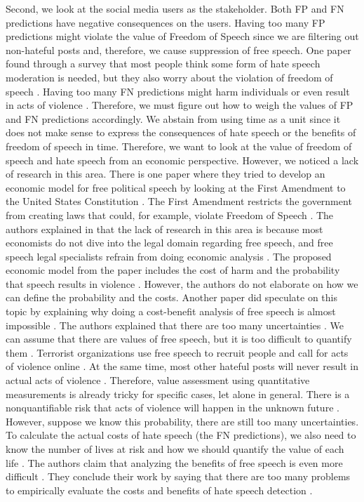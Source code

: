 Second, we look at the social media users as the stakeholder.
%
Both FP and FN predictions have negative consequences on the users.
%
Having too many FP predictions might violate the value of Freedom of Speech since we are filtering out non-hateful posts and, therefore, we cause suppression of free speech.
%
One paper found through a survey that most people think some form of hate speech moderation is needed, but they also worry about the violation of freedom of speech \citep{olteanu2017limits}.
%
Having too many FN predictions might harm individuals or even result in acts of violence \citep{ecri-hate-speech-and-violence}.
%
Therefore, we must figure out how to weigh the values of FP and FN predictions accordingly.
%
We abstain from using time as a unit since it does not make sense to express the consequences of hate speech or the benefits of freedom of speech in time.
%
Therefore, we want to look at the value of freedom of speech and hate speech from an economic perspective.
%
However, we noticed a lack of research in this area.
%
There is one paper where they tried to develop an economic model for free political speech by looking at the First Amendment to the United States Constitution \citep{posner1986free}.
%
The First Amendment restricts the government from creating laws that could, for example, violate Freedom of Speech \citep{first-amendment-white-house}.
%
The authors explained in \citet{posner1986free} that the lack of research in this area is because most economists do not dive into the legal domain regarding free speech, and free speech legal specialists refrain from doing economic analysis \citep{posner1986free}.
%
The proposed economic model from the paper includes the cost of harm and the probability that speech results in violence \citep{posner1986free}.
%
However, the authors do not elaborate on how we can define the probability and the costs. Another paper did speculate on this topic by explaining why doing a cost-benefit analysis of free speech is almost impossible \citep{sunstein2018does}.
%
The authors explained that there are too many uncertainties \citep{sunstein2018does}.
%
We can assume that there are values of free speech, but it is too difficult to quantify them \citep{sunstein2018does}.
%
Terrorist organizations use free speech to recruit people and call for acts of violence online \citep{sunstein2018does}.
%
At the same time, most other hateful posts will never result in actual acts of violence \citep{sunstein2018does}.
%
Therefore, value assessment using quantitative measurements is already tricky for specific cases, let alone in general.
%
There is a nonquantifiable risk that acts of violence will happen in the unknown future \citep{sunstein2018does}.
%
However, suppose we know this probability, there are still too many uncertainties.
%
To calculate the actual costs of hate speech (the FN predictions), we also need to know the number of lives at risk and how we should quantify the value of each life \citep{sunstein2018does}.
%
The authors claim that analyzing the benefits of free speech is even more difficult \citep{sunstein2018does}.
%
They conclude their work by saying that there are too many problems to empirically evaluate the costs and benefits of hate speech detection \citep{sunstein2018does}.
%


